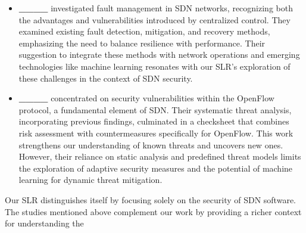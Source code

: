 \begin{itemize}
    \item \textbf{____} investigated fault management in SDN networks, recognizing both the advantages and vulnerabilities introduced by centralized control. They examined existing fault detection, mitigation, and recovery methods, emphasizing the need to balance resilience with performance. Their suggestion to integrate these methods with network operations and emerging technologies like machine learning resonates with our SLR's exploration of these challenges in the context of SDN security.
    
    \item \textbf{____} concentrated on security vulnerabilities within the OpenFlow protocol, a fundamental element of SDN. Their systematic threat analysis, incorporating previous findings, culminated in a checksheet that combines risk assessment with countermeasures specifically for OpenFlow. This work strengthens our understanding of known threats and uncovers new ones. However, their reliance on static analysis and predefined threat models limits the exploration of adaptive security measures and the potential of machine learning for dynamic threat mitigation.
\end{itemize}
Our SLR distinguishes itself by focusing solely on the security of SDN software. The studies mentioned above complement our work by providing a richer context for understanding the